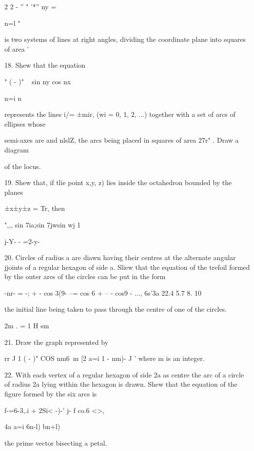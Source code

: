 2 2 - '' " '*'' ny =

n=l "

is two systems of lines at right angles, dividing the coordinate plane
into squares of area \pi'\ 

18. Shew that the equation

" ( - )" ~ sin ny cos nx \

n=i n ~

represents the lines i/= ±mir, (wi = 0, 1, 2, ...) together with a set
of arcs of ellipses whose

semi-axes are \pi and nlslZ, the arcs being placed in squares of area
27r" . Draw a diagram

of the locus. 

19. Shew that, if tlie point x,y, z) lies inside the octahedron
bounded by the planes

±x±y±z = Tr, then

",,, sin 7ia;sin 7jwsin wj 1

 j-Y- - =2-y-


20. Circles of radius a are diawn having their centres at the
alternate angular jjoints of a regular hexagon of side a. Sliew that
the equation of the trefoil formed by the outer arcs of the circles
can be put in the form

-nr- = -; + - cos 3(9- --= cos 6 + -- - cos9 - ..., 6s'3a 22.4 5.7 8.
10

the initial line being taken to pass through the centre of one of the
circles.


2m . = 1 H sm

%
%

21. Draw the graph represented by

rr J 1 ( - )" COS nm6\ m [2 a=i 1 - nm)- J ' where m is an integer.

22. With each vertex of a regular hexagon of side 2a as centre the arc
of a circle of radius 2a lying within the hexagon is drawn. Shew that
the equation of the figure formed by the six arcs is

f-=6-3,.i + 2Si< -)-' j- f co.6 <>,

4a a=i 6n-l) bn+l)

the prime vector bisecting a petal. 

